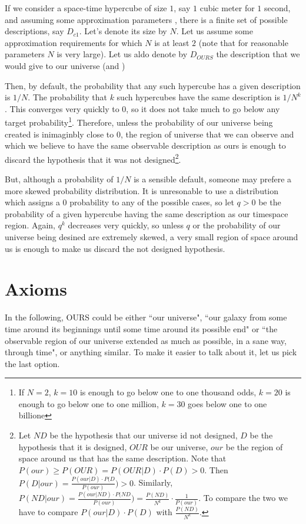 \documentclass[a4paper
,draft
]{article}
\newcommand{\svn}[2][]{\todo[author=Virgil,color=red!25!white,#1]{#2}}
\newcommand{\ghilimele}[1]{``#1"}
\begin{document}
If we consider a space-time hypercube of size $1$, say $1$ cubic meter for $1$ second, and assuming some approximation parameters \svn{define these before this section}, there is a finite set of possible descriptions, say $D_{c1}$. Let's denote its size by $N$. Let us assume some approximation requirements for which $N$ is at least $2$ (note that for reasonable parameters $N$ is very large). Let us aldo denote by $D_{OURS}$ the description that we would give to our universe (and )

Then, by default, the probability that any such hypercube has a given description is $1/N$. The probability that $k$ such hypercubes have the same description is $1/N^k$. This converges very quickly to $0$, so it does not take much to go below any target probability\footnote{If $N=2$, $k=10$ is enough to go below one to one thousand odds, $k=20$ is enough to go below one to one million, $k=30$ goes below one to one billione}. Therefore, unless the probability of our universe being created is inimaginbly close to $0$, the region of universe that we can observe and which we believe to have the same observable description as ours is enough to discard the hypothesis that it was not designed\footnote{Let $ND$ be the hypothesis that our universe id not designed, $D$ be the hypothesis that it is designed, $OUR$ be our universe, $our$ be the region of space around us that has the same description. Note that $P(our) \ge P(OUR)=P(OUR|D)\cdot P(D) > 0$. Then $P(D|our) = \frac{P(our|D)\cdot P(D}{P(our)}) > 0$. Similarly, $P(ND|our) = \frac{P(our|ND)\cdot P(ND}{P(our)}) = \frac{P(ND)}{N^k} \cdot \frac{1}{P(our)}$. To compare the two we have to compare $P(our|D)\cdot P(D)$ with $\frac{P(ND)}{N^k}$.}. 

But, although a probability of $1/N$ is a sensible default, someone may prefere
a more skewed probability distribution. It is unresonable to use a distribution
which assigns a $0$ probability to any of the possible cases, so let $q > 0$ be
the probability of a given hypercube having the same description as our
timespace region. Again, $q^k$ decreases very quickly, so unless $q$ or the
probability of our universe being desined are extremely skewed, a very small
region of space around us is enough to make us discard the not designed hypothesis.

\section{Axioms}

In the following, OURS could be either \ghilimele{our universe}, \ghilimele{our galaxy from some time around its beginnings until some time around its possible end} or \ghilimele{the observable region of our universe extended as much as possible, in a sane way, through time}, or anything similar. To make it easier to talk about it, let us pick the last option.
\end{document}
